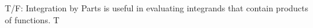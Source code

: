{T/F: Integration by Parts is useful in evaluating integrands that contain products of functions.
}
{T
}

